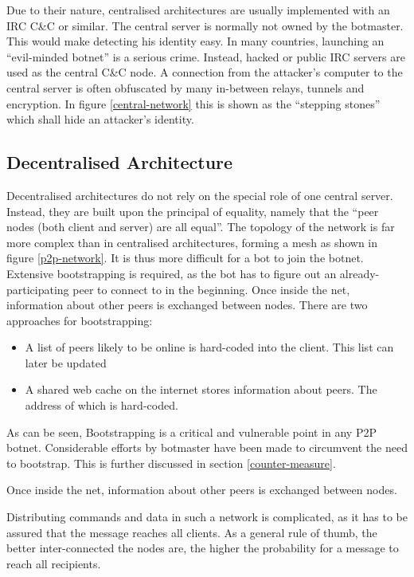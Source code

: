 \documentclass{llncs}
\begin{document}
Due to their nature, centralised architectures are usually implemented
with an IRC C\&C or similar\cite{cooke2005zombie}. The central server
is normally not owned by the botmaster. This would make detecting his
identity easy. In many countries, launching an ``evil-minded botnet''
is a serious crime. Instead, hacked or public IRC servers are used as
the central C\&C node. A connection from the attacker's computer to
the central server is often obfuscated by many in-between relays,
tunnels and encryption. In figure
\ref{central-network} this is shown as the ``stepping stones'' which
shall hide an attacker's identity.

\subsection{Decentralised Architecture}
\label{decent}
Decentralised architectures do not rely on the special role of one
central server. Instead, they are built upon the principal of
equality, namely that the ``peer nodes (both client and server) are
all equal''\cite{steggink2007detection}. The topology of the network
is far more complex than in centralised architectures, forming a mesh
as shown in figure \ref{p2p-network}. It is thus more difficult for a
bot to join the botnet. Extensive bootstrapping is required, as the
bot has to figure out an already-participating peer to connect to in the
beginning. Once inside the net, information about other peers is
exchanged between nodes. There are two approaches for bootstrapping\cite{wang2009systematic}:
\begin{itemize}
\item A list of peers likely to be online is hard-coded into the client. This list can later be updated
\item A shared web cache on the internet stores information about
  peers. The address of which is hard-coded.
\end{itemize}

As can be seen, Bootstrapping is a critical and vulnerable point in
any P2P botnet. Considerable efforts by botmaster have been made to
circumvent the need to bootstrap\cite{td1sc}. This is further
discussed in section \ref{counter-measure}.

Once inside the net, information about other peers is
exchanged between nodes.

Distributing commands and data in such a network is complicated, as it
has to be assured that the message reaches all clients. As a general
rule of thumb, the better inter-connected the nodes are, the higher
the probability for a message to reach all recipients.
\end{document}
